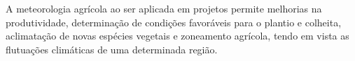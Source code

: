 \newpar A meteorologia agrícola ao ser aplicada em projetos permite melhorias na produtividade, determinação de condições favoráveis para o plantio e colheita, aclimatação de novas espécies vegetais e zoneamento agrícola, tendo em vista as flutuações climáticas de uma determinada região.